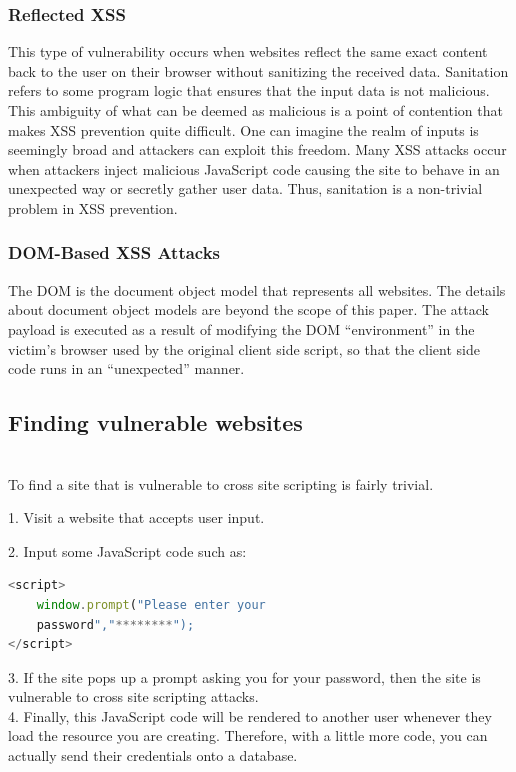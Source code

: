\documentclass[conference]{IEEEtran}
\begin{document}
\subsubsection{Reflected XSS}
This type of vulnerability occurs when websites reflect the same exact content back to the user on their browser without sanitizing the received data. Sanitation refers to some program logic that ensures that the input data is not malicious. This ambiguity of what can be deemed as malicious is a point of contention that makes XSS prevention quite difficult. One can imagine the realm of inputs is seemingly broad and attackers can exploit this freedom. Many XSS attacks occur when attackers inject malicious JavaScript code causing the site to behave in an unexpected way or secretly gather user data. Thus, sanitation is a non-trivial problem in XSS prevention.\\

\subsubsection{DOM-Based XSS Attacks}
The DOM is the document object model that represents all websites. The details about document object models are beyond the scope of this paper. The attack payload is executed as a result of modifying the DOM “environment” in the victim’s browser used by the original client side script, so that the client side code runs in an “unexpected” manner.
\subsection{Finding vulnerable websites}\\
To find a site that is vulnerable to cross site scripting is fairly trivial. \newline{}

1. Visit a website that accepts user input.

2. Input some JavaScript code such as: 

\begin{lstlisting}[language = JavaScript]
<script>
    window.prompt("Please enter your
    password","********");
</script>
\end{lstlisting}

3. If the site pops up a prompt asking you for your password, then the site is vulnerable to cross site scripting attacks.\\

4. Finally, this JavaScript code will be rendered to another user whenever they load the resource you are creating. Therefore, with a little more code, you can actually send their credentials onto a database.
\end{document}
